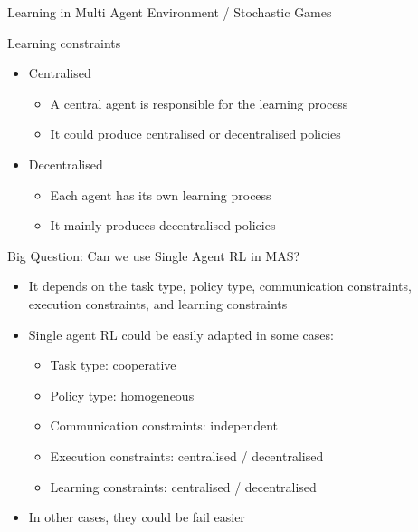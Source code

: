 \documentclass[presentation, 8pt]{beamer}\mode<presentation>{\usetheme{AMSBolognaFC}}
\begin{document}
\begin{frame}[allowframebreaks]{Learning in Multi Agent Environment / Stochastic Games}
\begin{exampleblock}{Learning constraints}
\begin{itemize}
	\item Centralised
	\begin{itemize}
		\item A central agent is responsible for the learning process
		\item It could produce centralised or decentralised policies
	\end{itemize}
	\item Decentralised
	\begin{itemize}
		\item Each agent has its own learning process
		\item It mainly produces decentralised policies
	\end{itemize}
\end{itemize}
\end{exampleblock}

\begin{alertblock}{Big Question: Can we use Single Agent RL in MAS?}
\begin{itemize}
	\item It depends on the task type, policy type, communication constraints, execution constraints, and learning constraints
	\item Single agent RL could be easily adapted in some cases:
	\begin{itemize}
		\item Task type: cooperative
		\item Policy type: homogeneous
		\item Communication constraints: independent
		\item Execution constraints: centralised / decentralised
		\item Learning constraints: centralised / decentralised
	\end{itemize}
	\item In other cases, they could be fail easier
\end{itemize}
\end{alertblock}
\end{frame}
\end{document}
